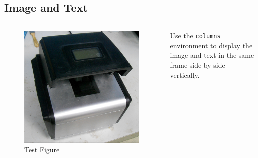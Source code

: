\documentclass[
        handout,
        ]{beamer}
\begin{document}
\subsection{Image and Text}
\begin{frame}[t]{\subsecname} %
    \begin{columns}
        \begin{figure}
        \centering
        \includegraphics[width=\textwidth]{im/testim}
        \caption{Test Figure}
        \end{figure}
        Use the \texttt{columns} environment to display the image and text in the same frame side by side vertically.
    \end{columns}
\end{frame}
\end{document}
